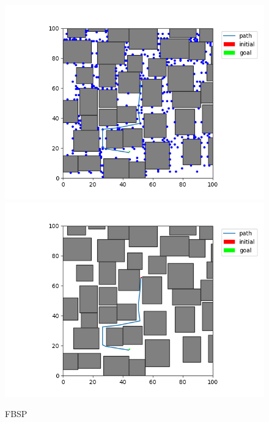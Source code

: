\documentclass[12pt,a4paper]{article}
\begin{document}
\begin{figure}[H]
\centering
	\includegraphics[scale=.40]{40_20_fbsp_state}
    \includegraphics[scale=.40]{40_20_fbsp_path}
\caption{FBSP}
\end{figure}

\newpage
\end{document}

